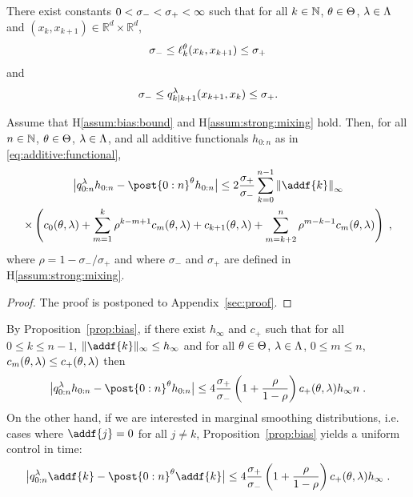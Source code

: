\documentclass{article}
\begin{document}
\begin{hypH}
\label{assum:strong:mixing}
There exist constants $0 < \sigma_- < \sigma_+ < \infty$ such that for all $k \in \mathbb{N}$, $\theta\in\Theta$, $\lambda\in\Lambda$ and $(x_k, x_{k + 1}) \in \mathbb{R}^d \times \mathbb{R}^d$, 
$$
    \sigma_- \leq \ell_{k}^{\theta}(x_k, x_{k + 1}) \leq \sigma_+
$$ 
and 
$$
    \sigma_- \leq  q_{k\vert k+1}^{\lambda}(x_{k+1}, x_{k}) \leq \sigma_+. 
$$ 
\end{hypH}


\begin{proposition}
\label{prop:bias}
Assume that H\ref{assum:bias:bound} and H\ref{assum:strong:mixing} hold. Then, for all $n \in \mathbb{N}$, $\theta\in\Theta$, $\lambda\in\Lambda$, and all additive functionals $h_{0:n}$ as in \eqref{eq:additive:functional},  
\begin{multline*}
        \big| \vd{0:n} h_{0:n} -  \post{0:n}^{\parvec} h_{0:n} \big| 
        \leq 2\frac{\sigma_+}{\sigma_-}\sum_{k=0}^{n-1}\left\| \addf{k}\right\|_\infty \\
        \times\left( c_0(\parvec,\parvar) + \sum_{m=1}^k \rho^{k-m+1}c_m(\parvec,\parvar) + c_{k+1}(\parvec,\parvar) + \sum_{m=k+2}^n \rho^{m-k-1}c_m(\parvec,\parvar)\right)\eqsp,
\end{multline*}
where $\rho = 1-\sigma_-/\sigma_+$ and where $\sigma_-$ and $\sigma_+$ are defined in H\ref{assum:strong:mixing}.
\end{proposition}

\begin{proof}
The proof is postponed to Appendix~\ref{sec:proof}.
\end{proof}
By Proposition~\ref{prop:bias}, if there exist $h_\infty$ and $c_+$ such that for all $0\leq k \leq n-1$, $\|\addf{k}\|_\infty\leq h_\infty$ and for all $\theta\in\Theta$, $\lambda\in\Lambda$, $0\leq m\leq n$, $c_m(\theta,\lambda)\leq c_+(\theta,\lambda)$ then
\begin{equation}
\label{eq:additive:error}
\big| \vd{0:n} h_{0:n} -  \post{0:n}^{\parvec} h_{0:n} \big| 
        \leq 4\frac{\sigma_+}{\sigma_-}\left(1 + \frac{\rho}{1-\rho}\right)c_+(\parvec,\parvar)h_\infty n\eqsp.
\end{equation}
On the other hand, if we are interested in marginal smoothing distributions, i.e. cases where $\addf{j} = 0$ for all $j\neq k$, Proposition~\ref{prop:bias} yields a uniform control in time:
$$
\big| \vd{0:n} \addf{k} -  \post{0:n}^{\parvec} \addf{k} \big| 
        \leq 4\frac{\sigma_+}{\sigma_-}\left(1 + \frac{\rho}{1-\rho}\right)c_+(\parvec,\parvar)h_\infty \eqsp.
$$
\end{document}
